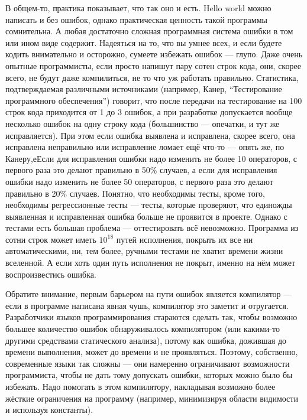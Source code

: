 \documentclass[a5paper]{article}
\begin{document}
В общем-то, практика показывает, что так оно и есть. Hello world можно написать и без ошибок, однако практическая ценность такой программы сомнительна. А любая достаточно сложная программная система ошибки в том или ином виде содержит. Надеяться на то, что вы умнее всех, и если будете кодить внимательно и осторожно, сумеете избежать ошибок --- глупо. Даже очень опытные программисты, если просто напишут пару сотен строк кода, они, скорее всего, не будут даже компилиться, не то что уж работать правильно. Статистика, подтверждаемая различными источниками (например, Канер, ``Тестирование программного обеспечения'') говорит, что после передачи на тестирование на 100 строк кода приходится от 1 до 3 ошибок, а при разработке допускается вообще несколько ошибок на одну строку кода (большинство --- опечатки, и тут же исправляется). При этом если ошибка выявлена и исправлена, скорее всего, она исправлена неправильно или исправление ломает ещё что-то --- опять же, по Канеру,еЕсли для исправления ошибки надо изменить не более 10 операторов, с первого раза это делают правильно в 50\% случаев, а если для исправления ошибки надо изменить не более 50 операторов, с первого раза это делают правильно в 20\% случаев. Понятно, что необходимы тесты, кроме того, необходимы регрессионные тесты --- тесты, которые проверяют, что единожды выявленная и исправленная ошибка больше не проявится в проекте. Однако с тестами есть большая проблема --- оттестировать всё невозможно. Программа из сотни строк может иметь $10^{18}$ путей исполнения, покрыть их все ни автоматическими, ни, тем более, ручными тестами не хватит времени жизни вселенной. А если хоть один путь исполнения не покрыт, именно на нём может воспроизвестись ошибка.

Обратите внимание, первым барьером на пути ошибок является компилятор --- если в программе написана явная чушь, компилятор это заметит и отругается. Разработчики языков программирования стараются сделать так, чтобы возможно большее количество ошибок обнаруживалось компилятором (или какими-то другими средствами статического анализа), потому как ошибка, дожившая до времени выполнения, может до времени и не проявляться. Поэтому, собственно, современные языки так сложны --- они намеренно ограничивают возможности программиста, чтобы не дать тому допускать ошибки, которых можно было бы избежать. Надо помогать в этом компилятору, накладывая возможно более жёсткие ограничения на программу (например, минимизируя области видимости и используя константы).
\end{document}
